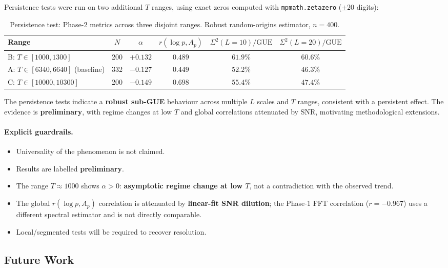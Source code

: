\documentclass[12pt, a4paper]{article}
\begin{document}
Persistence tests were run on two additional $T$ ranges,
using exact zeros computed with \texttt{mpmath.zetazero} ($\pm 20$ digits):

\begin{table}[H]
\centering
\caption{Persistence test: Phase-2 metrics across three disjoint ranges.
         Robust random-origins estimator, $n=400$.}
\begin{tabular}{lccccc}
\toprule
Range & $N$ & $\alpha$ & $r(\log p, A_p)$ & $\Sigma^2(L=10)/\mathrm{GUE}$ & $\Sigma^2(L=20)/\mathrm{GUE}$ \\
\midrule
B: $T\in[1000,1300]$             & 200 & $+0.132$ & $0.489$ & $61.9\%$ & $60.6\%$ \\
A: $T\in[6340,6640]$ (baseline) & 332 & $-0.127$ & $0.449$ & $52.2\%$ & $46.3\%$ \\
C: $T\in[10000,10300]$           & 200 & $-0.149$ & $0.698$ & $55.4\%$ & $47.4\%$ \\
\bottomrule
\end{tabular}
\label{tab:persistence}
\end{table}

The persistence tests indicate a \textbf{robust sub-GUE} behaviour across
multiple $L$ scales and $T$ ranges, consistent with a persistent effect.
The evidence is \textbf{preliminary}, with regime changes at low $T$ and
global correlations attenuated by SNR, motivating methodological extensions.

\paragraph{Explicit guardrails.}
\begin{itemize}
  \item Universality of the phenomenon is not claimed.
  \item Results are labelled \textbf{preliminary}.
  \item The range $T\approx 1000$ shows $\alpha > 0$: \textbf{asymptotic
        regime change at low $T$}, not a contradiction with the observed trend.
  \item The global $r(\log p, A_p)$ correlation is attenuated by
        \textbf{linear-fit SNR dilution}; the Phase-1 FFT correlation
        ($r=-0.967$) uses a different spectral estimator and is not directly
        comparable.
  \item Local/segmented tests will be required to recover resolution.
\end{itemize}

\subsection{Future Work}
\end{document}
